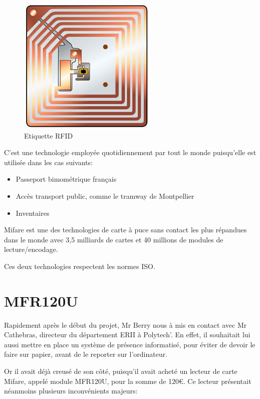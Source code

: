     \begin{figure}[h]
        \begin{center}
            \includegraphics[scale=0.6]{RFIDtag.jpg} 
        \end{center}

        \caption{Etiquette RFID}
        \label{Etiquette RFID}
    \end{figure}


C'est une technologie employée quotidiennement par tout le monde puisqu'elle
est utilisée dans les cas suivants:

    \begin{itemize}
    \item Passeport bimométrique français
    \item Accès transport public, comme le tramway de Montpellier
    \item Inventaires
    \end{itemize}

Mifare est une des technologies de carte à puce sans contact les plus répandues
dans le monde avec 3,5 milliards de cartes et 40 millions de modules de lecture/encodage.

Ces deux technologies respectent les normes ISO.

\section{MFR120U}

Rapidement après le début du projet, Mr Berry nous à mis en contact avec Mr
Cathebras, directeur du département ERII à Polytech'. En effet, il souhaitait lui
aussi mettre en place un système de présence informatisé, pour éviter de devoir
le faire sur papier, avant de le reporter sur l'ordinateur.

Or il avait déjà creusé de son côté, puisqu'il avait acheté un lecteur de carte 
Mifare, appelé module MFR120U, pour la somme de 120\euro. Ce lecteur présentait néanmoins
plusieurs inconvénients majeurs:

